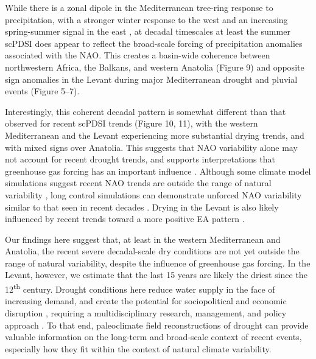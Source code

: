 \documentclass[draft,jgr]{AGUTeX}
\begin{document}
\begin{article}
While there is a zonal dipole in the Mediterranean tree-ring response to precipitation, with a stronger winter response to the west and an increasing spring-summer signal in the east \citep{Touchan:etal2014a,Touchan:etal2014b}, at decadal timescales at least the summer scPDSI does appear to reflect the broad-scale forcing of precipitation anomalies associated with the NAO. This creates a basin-wide coherence between northwestern Africa, the Balkans, and western Anatolia (Figure 9) and opposite sign anomalies in the Levant during major Mediterranean drought and pluvial events (Figure 5--7).  

Interestingly, this coherent decadal pattern is somewhat different than that observed for recent scPDSI trends (Figure 10, 11), with the western Mediterranean and the Levant experiencing more substantial drying trends, and with mixed signs over Anatolia.  This suggests that NAO variability alone may not account for recent drought trends, and supports interpretations that greenhouse gas forcing has an important influence \citep{Kelley2012,Kelley2015,Seager2014med}.  Although some climate model simulations suggest recent NAO trends are outside the range of natural variability \citep{Osborn:2004,Kuzmina:etal2005}, long control simulations can demonstrate unforced NAO variability similar to that seen in recent decades \citep{Semenov:etal2008}.  Drying in the Levant is also likely influenced by recent trends toward a more positive EA pattern \citep{Krichak:etal2002,Krichak:etal2005,Lim:2014}.

Our findings here suggest that, at least in the western Mediterranean and Anatolia, the recent severe decadal-scale dry conditions are not yet outside the range of natural variability, despite the influence of greenhouse gas forcing.  In the Levant, however, we estimate that the last 15 years are likely the driest since the 12\textsuperscript{th} century. Drought conditions here reduce water supply in the face of increasing demand, and create the potential for sociopolitical and economic disruption \citep[e.g.][]{Gleick2014,Kelley2015}, requiring a multidisciplinary research, management, and policy approach \citep{SolhvanGinkel2014}. To that end, paleoclimate field reconstructions of drought can provide valuable information on the long-term and broad-scale context of recent events, especially how they fit within the context of natural climate variability.



\end{article}
\end{document}
